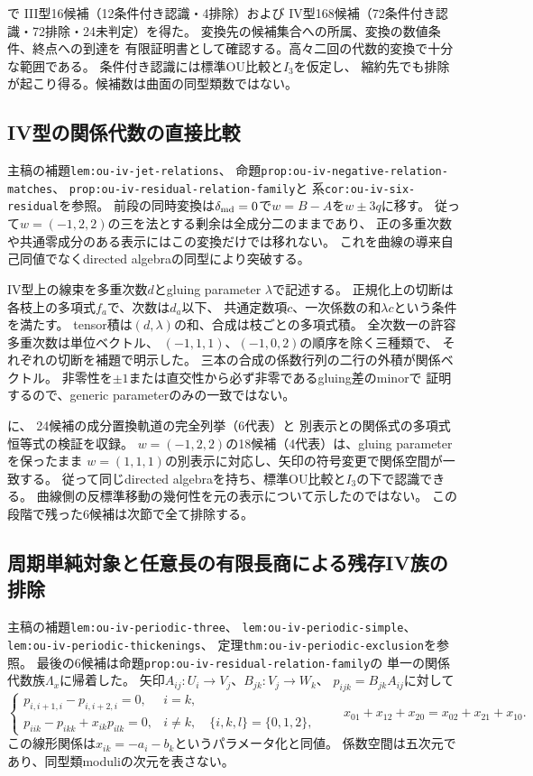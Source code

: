 \documentclass[11pt,a4paper]{ltjsarticle}
\begin{document}
で
III型16候補（12条件付き認識・4排除）および
IV型168候補（72条件付き認識・72排除・24未判定）を得た。
変換先の候補集合への所属、変換の数値条件、終点への到達を
有限証明書として確認する。高々二回の代数的変換で十分な範囲である。
条件付き認識には標準OU比較と$I_3$を仮定し、
縮約先でも排除が起こり得る。候補数は曲面の同型類数ではない。

\subsection*{IV型の関係代数の直接比較}
主稿の補題\texttt{lem:ou-iv-jet-relations}、
命題\texttt{prop:ou-iv-negative-relation-matches}、
\texttt{prop:ou-iv-residual-relation-family}と
系\texttt{cor:ou-iv-six-residual}を参照。
前段の同時変換は$\delta_{\rm md}=0$で$w=B-A$を$w\pm3q$に移す。
従って$w=(-1,2,2)$の三を法とする剰余は全成分二のままであり、
正の多重次数や共通零成分のある表示にはこの変換だけでは移れない。
これを曲線の導来自己同値でなくdirected algebraの同型により突破する。

IV型上の線束を多重次数$d$とgluing parameter $\lambda$で記述する。
正規化上の切断は各枝上の多項式$f_a$で、次数は$d_a$以下、
共通定数項$c$、一次係数の和$\lambda c$という条件を満たす。
tensor積は$(d,\lambda)$の和、合成は枝ごとの多項式積。
全次数一の許容多重次数は単位ベクトル、
$(-1,1,1)$、$(-1,0,2)$の順序を除く三種類で、
それぞれの切断を補題で明示した。
三本の合成の係数行列の二行の外積が関係ベクトル。
非零性を$\pm1$または直交性から必ず非零であるgluing差のminorで
証明するので、generic parameterのみの一致ではない。

に、
24候補の成分置換軌道の完全列挙（6代表）と
別表示との関係式の多項式恒等式の検証を収録。
$w=(-1,2,2)$の18候補（4代表）は、gluing parameterを保ったまま
$w=(1,1,1)$の別表示に対応し、矢印の符号変更で関係空間が一致する。
従って同じdirected algebraを持ち、標準OU比較と$I_3$の下で認識できる。
曲線側の反標準移動の幾何性を元の表示について示したのではない。
この段階で残った6候補は次節で全て排除する。

\subsection*{周期単純対象と任意長の有限長商による残存IV族の排除}
主稿の補題\texttt{lem:ou-iv-periodic-three}、
\texttt{lem:ou-iv-periodic-simple}、
\texttt{lem:ou-iv-periodic-thickenings}、
定理\texttt{thm:ou-iv-periodic-exclusion}を参照。
最後の6候補は命題\texttt{prop:ou-iv-residual-relation-family}の
単一の関係代数族$\Lambda_x$に帰着した。
矢印$A_{ij}:U_i\to V_j$、$B_{jk}:V_j\to W_k$、
$p_{ijk}=B_{jk}A_{ij}$に対して
\[
 \begin{cases}
 p_{i,i+1,i}-p_{i,i+2,i}=0,&i=k,\\
 p_{iik}-p_{ikk}+x_{ik}p_{ilk}=0,
 &i\ne k,\quad\{i,k,l\}=\{0,1,2\},
 \end{cases}
 \qquad
 x_{01}+x_{12}+x_{20}=x_{02}+x_{21}+x_{10}.
\]
この線形関係は$x_{ik}=-a_i-b_k$というパラメータ化と同値。
係数空間は五次元であり、同型類moduliの次元を表さない。
\end{document}
